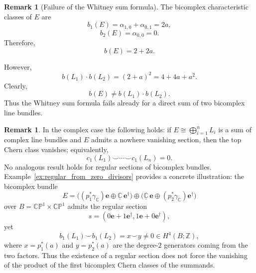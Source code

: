 \documentclass[11pt]{amsart}
\newcommand{\e}{\mathbf{e}}          %
\newcommand{\ed}{\mathbf{e}^\dagger} %
\newcommand{\wb}{b}
\newcommand{\CP}{\mathbb{CP}}
\theoremstyle{definition}
\newtheorem{remark}[prop]{Remark}            %
\begin{document}
\begin{remark}[Failure of the Whitney sum formula]
The bicomplex characteristic classes of $E$ are
\begin{equation*}
\wb_1(E) = \alpha_{1,0} + \alpha_{0,1} = 2a,
\end{equation*}
\begin{equation*}
\wb_2(E) = \alpha_{0,0} = 0.
\end{equation*}
Therefore,
\begin{equation*}
\wb(E) = 2 + 2a.
\end{equation*}

However,
\begin{equation*}
b(L_1)\cdot b(L_2) = (2 + a)^2 = 4 + 4a + a^2.
\end{equation*}
Clearly,
\begin{equation*}
b(E) \neq b(L_1)\cdot b(L_2).
\end{equation*}
Thus the Whitney sum formula fails already for a direct sum of two bicomplex line bundles.
\end{remark}

\begin{remark}
In the complex case the following holds: if $E\cong\bigoplus_{i=1}^{n}L_{i}$ is a sum of complex line bundles and $E$ admits a nowhere vanishing section, then the top Chern class vanishes; equivalently,
\begin{equation*}
c_{1}(L_{1})\smile\cdots\smile c_{1}(L_{n})=0.
\end{equation*}
No analogous result holds for regular sections of bicomplex bundles. Example~\ref{ex:regular_from_zero_divisors} provides a concrete illustration: the bicomplex bundle
\begin{equation*}
E=\bigl((p_{1}^{*}\gamma_{\mathbb{C}})\mathbf{e}\oplus\underline{\mathbb{C}}\,\mathbf{e}^{\dagger}\bigr)
   \oplus
   \bigl(\underline{\mathbb{C}}\,\mathbf{e}\oplus(p_{2}^{*}\gamma_{\mathbb{C}})\mathbf{e}^{\dagger}\bigr)
\end{equation*}
over $B=\CP^1\times\CP^1$ admits the regular section
\begin{equation*}
s=(0\e+1\ed,1\e+0\ed),
\end{equation*}
yet
\begin{equation*}
b_{1}(L_1)\smile b_1(L_2)=x\smile y\neq 0\in H^{4}(B;\mathbb{Z}),
\end{equation*}
where $x=p_{1}^{*}(a)$ and $y=p_{2}^{*}(a)$ are the degree-$2$ generators coming from the two factors. Thus the existence of a regular section does not force the vanishing of the product of the first bicomplex Chern classes of the summands.
\end{remark}
\end{document}
